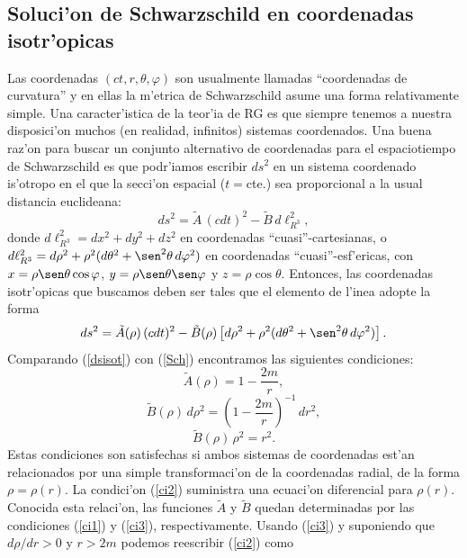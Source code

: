 \subsection{Soluci'on de Schwarzschild en coordenadas isotr'opicas}

Las coordenadas $(ct,r,\theta,\varphi)$ son usualmente llamadas ``coordenadas de curvatura'' y en ellas la m'etrica de Schwarzschild asume una forma relativamente simple.
Una caracter'istica de la teor'ia de RG es que siempre tenemos a
nuestra disposici'on muchos (en realidad, infinitos) sistemas coordenados. Una
buena raz'on para buscar un conjunto alternativo de coordenadas para el espaciotiempo de Schwarzschild es que podr'iamos escribir $ds^2$ en un sistema coordenado is'otropo en el que la secci'on espacial ($t=$cte.) sea proporcional a la usual distancia euclideana:
\begin{equation}
ds^2=\tilde{A}\,(cdt)^2-\tilde{B}\,d\ell^2_{R^3} ,
\end{equation}
donde $d\ell^2_{R^3}=dx^2+dy^2+dz^2$ en coordenadas ``cuasi''-cartesianas, o
$d\ell^2_{R^3}=d\rho^2+\rho^2(d\theta^2+\sen^2\theta\,d\varphi^2)$ en coordenadas
``cuasi''-esf'ericas, con $x=\rho\sen\theta\cos\varphi$, $y=\rho\sen\theta\sen\varphi$ y $z=\rho\cos\theta$.
Entonces, las coordenadas isotr'opicas que buscamos deben ser tales que el elemento de l'inea adopte la forma
\begin{equation}
ds^2=\tilde{A}(\rho)\,(cdt)^2-\tilde{B}(\rho)\left[d\rho^2+\rho^2(d\theta^2+\sen^2\theta\,d\varphi^2)\right] .\label{dsisot}
\end{equation}
Comparando (\ref{dsisot}) con (\ref{Sch}) encontramos las siguientes condiciones:
\begin{equation}
 \tilde{A}(\rho)=1-\frac{2m}{r}, \label{ci1}
\end{equation}
\begin{equation}
 \tilde{B}(\rho)\,d\rho^2=\left(1-\frac{2m}{r}\right)^{-1}\,dr^2, \label{ci2}
\end{equation}
\begin{equation}
 \tilde{B}(\rho)\,\rho^2=r^2. \label{ci3}
\end{equation}
Estas condiciones son satisfechas si ambos sistemas de coordenadas est'an relacionados por una simple transformaci'on de la coordenadas radial, de la forma $\rho=\rho(r)$. La condici'on (\ref{ci2}) suministra una ecuaci'on diferencial para $\rho(r)$. Conocida esta relaci'on, las funciones $\tilde{A}$ y $\tilde{B}$ quedan determinadas por las condiciones (\ref{ci1}) y (\ref{ci3}), respectivamente. Usando (\ref{ci3}) y suponiendo que $d\rho/dr>0$ y $r>2m$ podemos reescribir (\ref{ci2}) como
